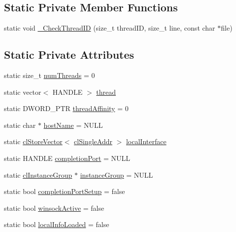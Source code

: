 \subsection*{Static Private Member Functions}
\begin{DoxyCompactItemize}
\item 
static void \hyperlink{classcl_networking_utility_a7679c07c1af0b4efa9de51b2b52f263a}{\_\-CheckThreadID} (size\_\-t threadID, size\_\-t line, const char $\ast$file)
\end{DoxyCompactItemize}
\subsection*{Static Private Attributes}
\begin{DoxyCompactItemize}
\item 
static size\_\-t \hyperlink{classcl_networking_utility_a7f033e0caca77ee312fad6b54c224dad}{numThreads} = 0
\item 
static vector$<$ HANDLE $>$ \hyperlink{classcl_networking_utility_ad039e5b653267dc859efd3bc227038e9}{thread}
\item 
static DWORD\_\-PTR \hyperlink{classcl_networking_utility_a282c5753f6f2ca19c16274e16851ba0c}{threadAffinity} = 0
\item 
static char $\ast$ \hyperlink{classcl_networking_utility_a9b72f62c150bd20204762c3570eb8285}{hostName} = NULL
\item 
static \hyperlink{classcl_store_vector}{clStoreVector}$<$ \hyperlink{classcl_single_addr}{clSingleAddr} $>$ \hyperlink{classcl_networking_utility_a13b355810ffbc409a87fe6c208ecaa3b}{localInterface}
\item 
static HANDLE \hyperlink{classcl_networking_utility_a0c6d125c3ce6d61803f1ae71d1f5a84d}{completionPort} = NULL
\item 
static \hyperlink{classcl_instance_group}{clInstanceGroup} $\ast$ \hyperlink{classcl_networking_utility_adb843095706e79d22e1797f869f5bf8b}{instanceGroup} = NULL
\item 
static bool \hyperlink{classcl_networking_utility_a8af49cca32d17b16891952a7ec3d7fa2}{completionPortSetup} = false
\item 
static bool \hyperlink{classcl_networking_utility_a6d1bd1ea9a0533307f0a1cb034d94980}{winsockActive} = false
\item 
static bool \hyperlink{classcl_networking_utility_a766d28dd514254451214cb339c6d009b}{localInfoLoaded} = false
\end{DoxyCompactItemize}


